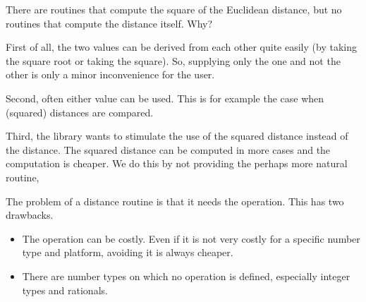 There are routines that compute the square of the Euclidean distance, but no
routines that compute the distance itself. Why?

First of all, the two values can be derived from each other quite easily (by
taking the square root or taking the square). So, supplying only the one and
not the other is only a minor inconvenience for the user.

Second, often either value can be used. This is for example the case when
(squared) distances are compared.

Third, the library wants to stimulate the use of the squared distance instead
of the distance. The squared distance can be computed in more cases and the
computation is cheaper.
We do this by not providing the perhaps more natural routine,

The problem of a distance routine is that it needs the 
operation.
This has two drawbacks.
\begin{itemize}
\item
The  operation can be costly. Even if it is not very costly for
a specific number type and platform, avoiding it is always cheaper.
\item
There are number types on which no  operation is defined,
especially integer types and rationals.
\end{itemize}

